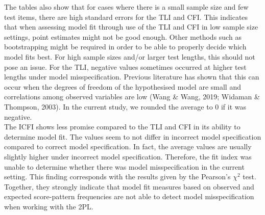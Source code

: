 \documentclass[Royal,sageapa,times,doublespace]{sagej}
\begin{document}
\indent The tables also show that for cases where there is a small sample size and few test items, there are high standard errors for the TLI and CFI. This indicates that when assessing model fit through use of the TLI and CFI in low sample size settings, point estimates might not be good enough. Other methods such as bootstrapping might be required in order to be able to properly decide which model fits best. For high sample sizes and/or larger test lengths, this should not pose an issue. For the TLI, negative values sometimes occurred at higher test lengths under model misspecification. Previous literature has shown that this can occur when the degrees of freedom of the hypothesised model are small and correlations among observed variables are low (Wang \& Wang, 2019; Widaman \& Thompson, 2003). In the current study, we rounded the average to 0 if it was negative. \\
\indent The ICFI shows less promise compared to the TLI and CFI in its ability to determine model fit. The values seem to not differ in incorrect model specification compared to correct model specification. In fact, the average values are usually slightly higher under incorrect model specification. Therefore, the fit index was unable to determine whether there was model misspecification in the current setting. This finding corresponds with the results given by the Pearson's $\chi^2$ test. Together, they strongly indicate that model fit measures based on observed and expected score-pattern frequencies are not able to detect model misspecification when working with the 2PL. \\
\end{document}
